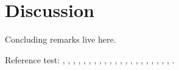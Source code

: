 \section{Discussion}
\label{sec:discussion}

Concluding remarks live here.

Reference test:
\cite{ArcherWest2003},
\cite{BarrettJolleyetal2010},
\cite{Chaetal2009},
\cite{Chuetal2006},
\cite{Clarketal2011},
\cite{Grishkoetal2010},
\cite{Halletal1996},
\cite{Hille2001},
\cite{HorriganAldrich2002},
\cite{LesageLazdunski2000},
\cite{Lewisetal2011},
\cite{Maleckaretal2009},
\cite{Mankin1982},
\cite{MillwardSadleretal2000},
\cite{Nygrenetal1998},
\cite{Poole1997},
\cite{RadhakrishnanHindmarsh1993},
\cite{Scholz2002},
\cite{Stockwell1991},
\cite{Sugimotoetal1996},
\cite{Tsugaetal2001},
\cite{UNKNOWN}.

